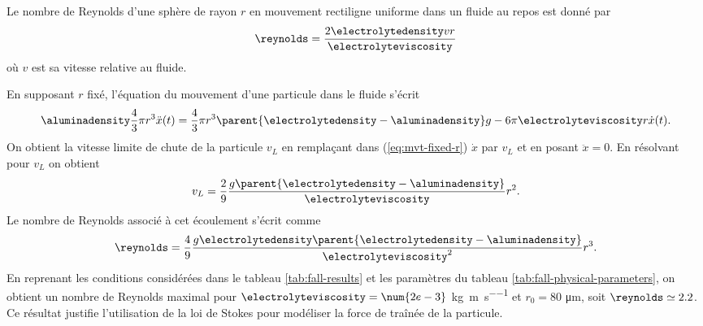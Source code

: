 \begin{remarque}
  Le nombre de Reynolds d'une sphère de rayon $r$ en mouvement
  rectiligne uniforme dans un fluide au repos est donné par
  \begin{equation*}
    \reynolds = \frac{2 \electrolytedensity v r}{\electrolyteviscosity}
  \end{equation*}
  où $v$ est sa vitesse relative au fluide.

  En supposant $r$ fixé, l'équation du mouvement d'une particule
  dans le fluide s'écrit
  \begin{equation}\label{eq:mvt-fixed-r}
    \aluminadensity \frac{4}{3}\pi r^3 \ddot x(t) = \frac{4}{3}\pi r^3\parent{\electrolytedensity - \aluminadensity}g -
  6\pi\electrolyteviscosity r\dot x(t).
  \end{equation}
  On obtient la vitesse limite de chute de la particule $v_L$ en
  remplaçant dans (\ref{eq:mvt-fixed-r}) $\dot x$ par $v_L$ et en posant $\ddot x
  = 0$. En résolvant pour $v_L$ on obtient
  \begin{equation}\label{eq:terminal-velocity}
    v_L = \frac{2}{9}\frac{g\parent{\electrolytedensity - \aluminadensity}}{\electrolyteviscosity}r^2.
  \end{equation}
  Le nombre de Reynolds associé à cet écoulement s'écrit comme
  \begin{equation*}
    \reynolds = \frac{4}{9}\frac{g\electrolytedensity\parent{\electrolytedensity - \aluminadensity}}{\electrolyteviscosity^2}r^3.
  \end{equation*}
  En reprenant les conditions considérées dans le tableau
  \ref{tab:fall-results} et les paramètres du tableau
  \ref{tab:fall-physical-parameters}, on obtient un nombre de Reynolds
  maximal pour $\electrolyteviscosity = \num{2e-3}$
  \si{\kilo\gram\per\meter\per\second} et $r_0 = 80$
  \si{\micro\meter}, soit $\reynolds \simeq 2.2$. Ce résultat justifie
  l'utilisation de la loi de Stokes pour modéliser la force de traînée
  de la particule.
\end{remarque}

